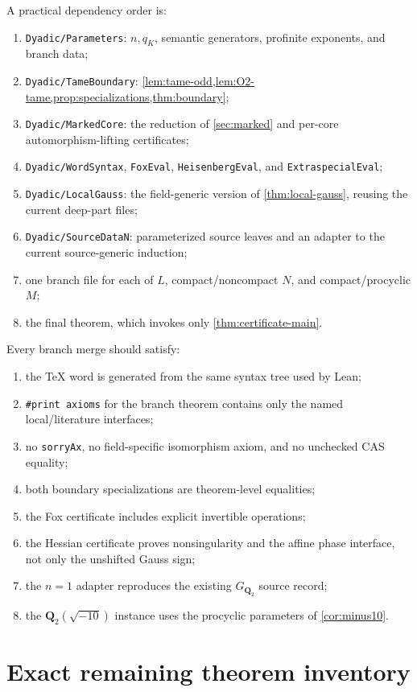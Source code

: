 \documentclass[11pt,reqno]{amsart}
\theoremstyle{remark}
\numberwithin{equation}{section}
\newcommand{\Q}{\mathbf Q}
\begin{document}
A practical dependency order is:
\begin{enumerate}
\item \texttt{Dyadic/Parameters}: \(n,q_K\), semantic generators,
profinite exponents, and branch data;
\item \texttt{Dyadic/TameBoundary}: \cref{lem:tame-odd,lem:O2-tame,prop:specializations,thm:boundary};
\item \texttt{Dyadic/MarkedCore}: the reduction of \cref{sec:marked} and
per-core automorphism-lifting certificates;
\item \texttt{Dyadic/WordSyntax}, \texttt{FoxEval},
\texttt{HeisenbergEval}, and \texttt{ExtraspecialEval};
\item \texttt{Dyadic/LocalGauss}: the field-generic version of
\cref{thm:local-gauss}, reusing the current deep-part files;
\item \texttt{Dyadic/SourceDataN}: parameterized source leaves and an
adapter to the current source-generic induction;
\item one branch file for each of \(L\), compact/noncompact \(N\), and
compact/procyclic \(M\);
\item the final theorem, which invokes only
\cref{thm:certificate-main}.
\end{enumerate}

Every branch merge should satisfy:
\begin{enumerate}
\item the TeX word is generated from the same syntax tree used by Lean;
\item \texttt{\#print axioms} for the branch theorem contains only the
named local/literature interfaces;
\item no \texttt{sorryAx}, no field-specific isomorphism axiom, and no
unchecked CAS equality;
\item both boundary specializations are theorem-level equalities;
\item the Fox certificate includes explicit invertible operations;
\item the Hessian certificate proves nonsingularity and the affine phase
interface, not only the unshifted Gauss sign;
\item the \(n=1\) adapter reproduces the existing \(G_{\Q_2}\) source
record;
\item the \(\Q_2(\sqrt{-10})\) instance uses the procyclic parameters of
\cref{cor:minus10}.
\end{enumerate}

\section{Exact remaining theorem inventory}
\end{document}
